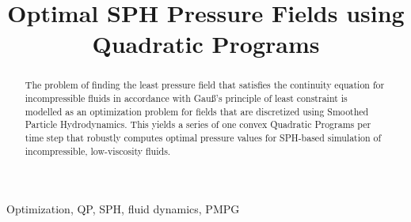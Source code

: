 \documentclass[conference]{IEEEtran}
\begin{document}
\title{Optimal SPH Pressure Fields using Quadratic Programs\\
}

\author{
}

\maketitle

\begin{abstract}
The problem of finding the least pressure field that satisfies the continuity equation for incompressible fluids in accordance with Gau\ss's principle of least constraint is modelled as an optimization problem for fields that are discretized using Smoothed Particle Hydrodynamics. This yields a series of one convex Quadratic Programs per time step that robustly computes optimal pressure values for SPH-based simulation of incompressible, low-viscosity fluids.\textsl{}
\end{abstract}

\begin{IEEEkeywords}
Optimization, QP, SPH, fluid dynamics, PMPG
\end{IEEEkeywords}
\end{document}
